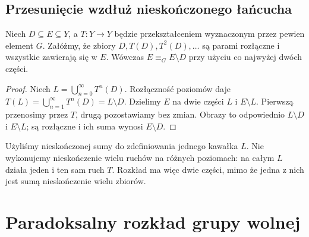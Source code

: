 \subsection{Przesunięcie wzdłuż nieskończonego łańcucha}
\begin{lemat}\label{lem:lancuch}
Niech $D\subseteq E\subseteq Y$, a $T:Y\to Y$ będzie przekształceniem wyznaczonym przez pewien element $G$. Załóżmy, że zbiory $D,T(D),T^2(D),\ldots$ są parami rozłączne i wszystkie zawierają się w $E$. Wówczas $E\mathrel{\equiv_G} E\setminus D$ przy użyciu co najwyżej dwóch części.
\end{lemat}
\begin{proof}
Niech $L=\bigcup_{n=0}^{\infty}T^n(D)$. Rozłączność poziomów daje $T(L)=\bigcup_{n=1}^{\infty}T^n(D)=L\setminus D$. Dzielimy $E$ na dwie części $L$ i $E\setminus L$. Pierwszą przenosimy przez $T$, drugą pozostawiamy bez zmian. Obrazy to odpowiednio $L\setminus D$ i $E\setminus L$; są rozłączne i ich suma wynosi $E\setminus D$.
\end{proof}
\begin{uwaga}
Użyliśmy nieskończonej sumy do zdefiniowania jednego kawałka $L$. Nie wykonujemy nieskończenie wielu ruchów na różnych poziomach: na całym $L$ działa jeden i ten sam ruch $T$. Rozkład ma więc dwie części, mimo że jedna z nich jest sumą nieskończenie wielu zbiorów.
\end{uwaga}

\section{Paradoksalny rozkład grupy wolnej}
